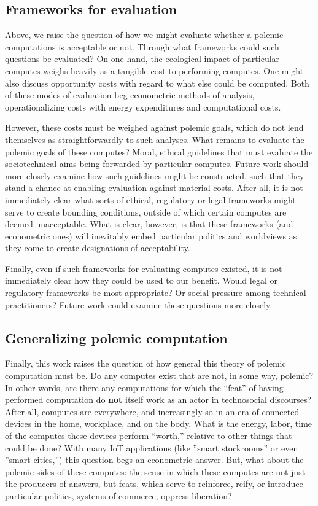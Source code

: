 \documentclass[sigconf]{acmart}
\begin{document}
\subsection{Frameworks for evaluation}
\label{sec:orgbd60d64}
Above, we raise the question of how we might evaluate whether a polemic computations is acceptable or not.
Through what frameworks could such questions be evaluated? 
On one hand, the ecological impact of particular computes weighs heavily as a tangible cost to performing computes.
One might also discuss opportunity costs with regard to what else could be computed.
Both of these modes of evaluation beg econometric methods of analysis, 
operationalizing costs with energy expenditures and computational costs.

However, these costs must be weighed against polemic goals, which do not lend themselves as straightforwardly to such analyses.
What remains to evaluate the polemic goals of these computes?
Moral, ethical guidelines that must evaluate the sociotechnical aims being forwarded by particular computes. 
Future work should more closely examine how such guidelines might be constructed, such that they stand a chance at enabling evaluation against material costs.
After all, it is not immediately clear what sorts of ethical, regulatory or legal frameworks 
might serve to create bounding conditions, outside of which certain computes are deemed unacceptable.
What is clear, however, is that these frameworks (and econometric ones) will inevitably
embed particular politics and worldviews as they come to create designations of acceptability.

Finally, even if such frameworks for evaluating computes existed, it is not immediately clear how they could be used to our benefit. 
Would legal or regulatory frameworks be most appropriate?
Or social pressure among technical practitioners?
Future work could examine these questions more closely.


\subsection{Generalizing polemic computation}
\label{sec:orgd9dc1f9}
Finally, this work raises the question of how general this theory of polemic computation must be.
Do any computes exist that are not, in some way, polemic?
In other words, are there any computations for which the ``feat'' of having performed computation do \textbf{not} itself work as an actor in technosocial discourses?
After all, computes are everywhere, and increasingly so in an era of connected devices in the home, workplace, and on the body. 
What is the energy, labor, time of the computes these devices perform ``worth,'' relative to other things that could be done?
With many IoT applications (like ''smart stockrooms'' or even ''smart cities,'') this question begs an econometric answer.
But, what about the polemic sides of these computes: the sense in which these computes are not just the producers of answers, but feats, which serve to reinforce, reify, or introduce particular politics, systems of commerce, oppress liberation?
\end{document}
